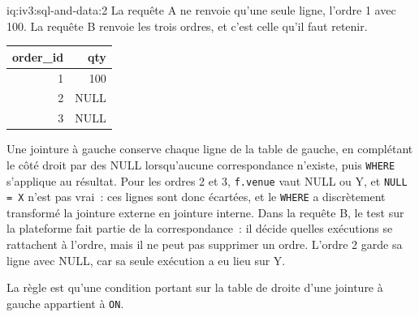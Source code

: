 \begin{solution}{iq:iv3:sql-and-data:2}
La requête A ne renvoie qu'une seule ligne, l'ordre 1 avec 100. La requête B renvoie les trois ordres, et c'est celle qu'il faut retenir.
\begin{center}\small
\begin{tabular}{rr}
order\_id & qty\\\hline
1 & 100\\
2 & NULL\\
3 & NULL
\end{tabular}
\end{center}
Une jointure à gauche conserve chaque ligne de la table de gauche, en complétant le côté droit par des NULL lorsqu'aucune correspondance n'existe, puis \texttt{WHERE} s'applique au résultat. Pour les ordres 2 et 3, \texttt{f.venue} vaut NULL ou Y, et \texttt{NULL = \textquotesingle{}X\textquotesingle{}} n'est pas vrai~: ces lignes sont donc écartées, et le \texttt{WHERE} a discrètement transformé la jointure externe en jointure interne. Dans la requête B, le test sur la plateforme fait partie de la correspondance~: il décide quelles exécutions se rattachent à l'ordre, mais il ne peut pas supprimer un ordre. L'ordre 2 garde sa ligne avec NULL, car sa seule exécution a eu lieu sur Y.

La règle est qu'une condition portant sur la table de droite d'une jointure à gauche appartient à \texttt{ON}.

\end{solution}

